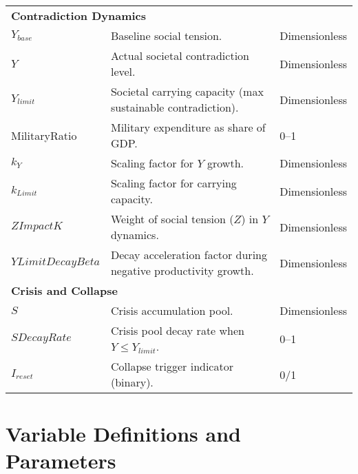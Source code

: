 \documentclass{article}
\begin{document}
\begin{longtable}{p{3cm} p{6cm} p{3cm}}
\multicolumn{3}{l}{\textbf{Contradiction Dynamics}} \\
$Y_{base}$            & Baseline social tension. & Dimensionless \\
$Y$                   & Actual societal contradiction level. & Dimensionless \\
$Y_{limit}$           & Societal carrying capacity (max sustainable contradiction). & Dimensionless \\
MilitaryRatio         & Military expenditure as share of GDP. & 0–1 \\
$k_Y$                 & Scaling factor for $Y$ growth. & Dimensionless \\
$k_{Limit}$           & Scaling factor for carrying capacity. & Dimensionless \\
$ZImpactK$            & Weight of social tension ($Z$) in $Y$ dynamics. & Dimensionless \\
$YLimitDecayBeta$     & Decay acceleration factor during negative productivity growth. & Dimensionless \\

\multicolumn{3}{l}{\textbf{Crisis and Collapse}} \\
$S$                   & Crisis accumulation pool. & Dimensionless \\
$SDecayRate$          & Crisis pool decay rate when $Y \leq Y_{limit}$. & 0–1 \\
$I_{reset}$           & Collapse trigger indicator (binary). & 0/1 \\

\hline
\end{longtable}
\section{Variable Definitions and Parameters}
\end{document}
